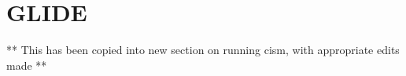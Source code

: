 \section{GLIDE}

** This has been copied into new section on running cism, with appropriate edits made **

%
%
